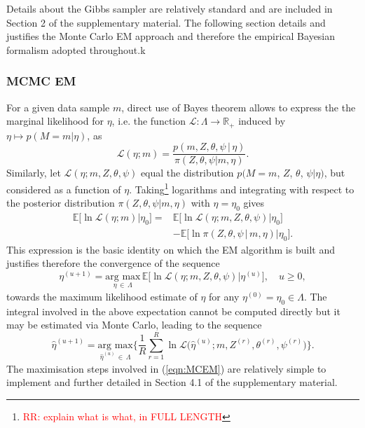 \documentclass{bioinfo}
\begin{document}
Details about the Gibbs sampler are relatively standard and are
included in Section 2 of the supplementary material. The following
section details and justifies the Monte Carlo EM approach and
therefore the empirical Bayesian formalism adopted throughout.k

\subsubsection{MCMC EM}\label{sec:MCMCEM}
For a given data sample $m$, direct use of Bayes theorem
allows to  express the the marginal likelihood for $\eta$, i.e. the
function $\mathcal L: \Lambda \to \mathbb R_+$ induced by $\eta 
\mapsto p(M=m|\eta)$, as
\begin{equation}
  \label{eqn:margLik}
  \mathcal L(\eta; m) 
  = \frac{p(m, Z, \theta, \psi\,|\,\eta)}{\pi(Z,
      \theta, \psi|m, \eta)}.
\end{equation}
Similarly, let $\mathcal L(\eta; m, Z, \theta, \psi)$ equal the
distribution $p(M=m$, $Z$, $\theta$, $\psi|\eta)$, but considered as a
function of $\eta$. Taking\footnote{\textcolor{red}{RR: explain what is what, in FULL
 LENGTH}} logarithms and integrating with respect to the posterior 
distribution  $\pi(Z,  \theta, \psi|m,  \eta)$ with $\eta = \eta_0$
gives 
\begin{align*}
   \mathbb E\big[\ln\mathcal L(\eta; m) \big| \eta_0\big] 
  =& 
  \mathbb E\big[\ln\mathcal L(\eta; m, Z, \theta, \psi)
    \big|  \eta_0\big]\\ 
  &-
  \mathbb E\big[\ln \pi(Z, \theta, \psi\,|\,m,\eta)\big| \eta_0\big].
\end{align*}  
This expression is the basic identity on which the EM algorithm is
built and justifies therefore the convergence of the sequence
\begin{equation}
 \label{eqn:EofMCEM}
  \eta^{(u+1)} = \underset{\eta\,\in\, \Lambda}{\text{arg max}}\, 
  \mathbb E\Big[\ln\mathcal L(\eta; m, Z, \theta, \psi)\big|
  \eta^{(u)}\Big], 
  \quad u\geqslant 0,
\end{equation}
towards the maximum likelihood estimate of $\eta$ for any $\eta^{(0)}
= \eta_0  \in \Lambda$. The integral involved in the above expectation
cannot be computed directly but it may be estimated via Monte Carlo,
leading to the sequence 
\begin{equation}
 \label{eqn:MCEM}
   \hat\eta^{(u+1)}
 = 
    \underset{\hat\eta^{(u)}\,\in\,\Lambda}{\text{arg max}} 
   \bigg\{
    \frac{1}{R}\sum_{r=1}^R 
      \ln\mathcal L\Big(\hat\eta^{(u)}; m, Z^{(r)}, \theta^{(r)},
      \psi^{(r)}\Big)
   \bigg\}.
\end{equation}
The maximisation steps involved in (\ref{eqn:MCEM}) are relatively
simple to implement and further detailed in Section 4.1 of the
supplementary material.
\end{document}
